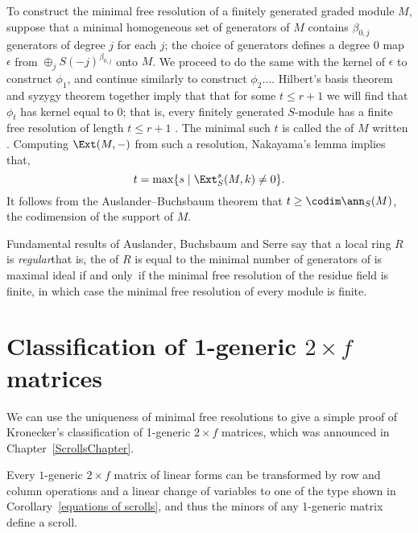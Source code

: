 To construct the minimal free resolution of a finitely generated graded module $M$, suppose that a minimal homogeneous set of generators
of $M$
contains $\beta_{0,j}$ generators of degree $j$ for each $j$; the choice of generators
defines a degree 0 map $\epsilon$
from
$
\oplus_jS(-j)^{\beta_{0,j}}
$
onto $M$. We proceed to do the same with the kernel of $\epsilon$ to construct $\phi_{1}$, and continue similarly to construct $\phi_{2}\dots$.
Hilbert's basis theorem
%
and
syzygy theorem
%
together imply that 
that for some $t\leq r+1$ we will find that $\phi_t$ has
kernel equal to 0; that is,
every finitely
generated $S$-module has a finite free resolution
of length $t\leq r+1$
\cite[Corollary 19.7]{Eisenbud1995}.
The minimal such $t$ is called the of $M$ written .
%
\index{\pd}%
Computing $\Ext(M,-)$ from such a resolution, Nakayama's lemma implies that,
$$
t = \max\{s \mid \Ext_S^s(M,k) \neq 0 \}.
$$
It follows from the Auslander--Buchsbaum
%
theorem \cite[Theorem 19.9]{Eisenbud1995} that $t \geq \codim \ann_S(M)$,
the codimension of the support of $M$.

\begin{fact}
 Fundamental
results of Auslander, Buchsbaum and Serre say that a local ring $R$
%
%
%
is \emph{regular}\emdash that is, the
%
%
of $R$ is equal to the
minimal number
of generators of is maximal ideal \emdash if and only~if the minimal free resolution
of the residue field is finite, in which case
the minimal free resolution of every module is finite.
\end{fact}
 



\section{Classification of 1-generic \texorpdfstring{$2\times f$}{2 x f}
matrices}\label{Kronecker}

We can use the uniqueness of minimal free resolutions to give a simple
proof of Kronecker's classification of 1-generic $2\times f$
%
matrices, which was announced in Chapter~\ref{ScrollsChapter}.

\begin{theorem}\label{matrix pencils}
Every
$1$-generic $2 \times f$ matrix of linear forms can be transformed by
row and column operations and a linear change
of variables to one of the type shown in
Corollary~\ref{equations of scrolls}, and thus the minors of any 1-generic
matrix define a scroll.
\unif
\end{theorem}

